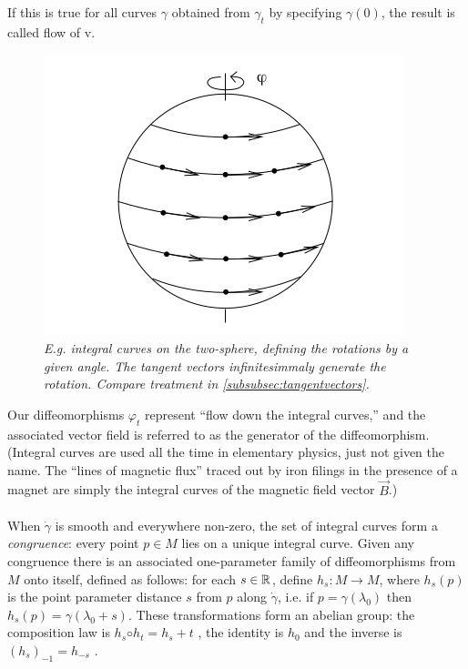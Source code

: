 If this is true for all curves $\gamma$ obtained from $\gamma_t$ by specifying $\gamma(0)$, the result is called flow of v.
\begin{figure}[h!]
	\centering
	\includegraphics[width=0.7\linewidth]{gfx/IntegralCurvesTwoSphere}
	\caption{\itshape E.g. integral curves on the two-sphere, defining the rotations by a given angle. The tangent vectors infinitesimmaly generate the rotation. Compare treatment in \ref{subsubsec:tangentvectors}.}
	\label{fig:integralcurvestwosphere}
\end{figure}
Our diffeomorphisms $φ_t$ represent “flow down the integral
curves,” and the associated vector field is referred to as the generator of the diffeomorphism.
(Integral curves are used all the time in elementary physics, just not given the name. The
“lines of magnetic flux” traced out by iron filings in the presence of a magnet are simply the
integral curves of the magnetic field vector $\vec{B}$.)\\
\\
When $\dot{\gamma}$ is smooth and everywhere non-zero, the set of integral curves form a
\emph{congruence}: every point $p \in M$ lies on a unique integral curve. Given any congruence
there is an associated one-parameter family of diffeomorphisms from $M$ onto itself,
defined as follows: for each $s \in \mathbb{R}$, define $h_s : M → M $, where $h_s (p)$ is the point
parameter distance $s$ from $p$ along $\dot{\gamma}$, i.e. if $p = γ(λ_0 )$ then $h_s (p) = γ(λ_0 + s)$. These
transformations form an abelian group: the composition law is $h_s ◦ h_t = h_s+t$ , the
identity is $h_0$ and the inverse is $(h_s )_{ −1} = h_{ −s}$ .




